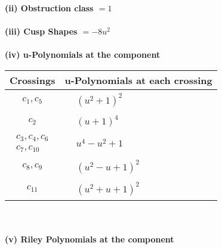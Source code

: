 \documentclass[1p]{elsarticle_modified}
\theoremstyle{definition}
\begin{document}
\flushleft \textbf{(ii) Obstruction class $= 1$}\\~\\
\flushleft \textbf{(iii) Cusp Shapes $= -8 u^2$}\\~\\
\newpage\renewcommand{\arraystretch}{1}
\flushleft \textbf{(iv) u-Polynomials at the component}\newline \\
\begin{tabular}{m{50pt}|m{274pt}}
Crossings & \hspace{64pt}u-Polynomials at each crossing \\
\hline $$\begin{aligned}c_{1},c_{5}\end{aligned}$$&$\begin{aligned}
&(u^2+1)^2
\end{aligned}$\\
\hline $$\begin{aligned}c_{2}\end{aligned}$$&$\begin{aligned}
&(u+1)^4
\end{aligned}$\\
\hline $$\begin{aligned}c_{3},c_{4},c_{6}\\c_{7},c_{10}\end{aligned}$$&$\begin{aligned}
&u^4- u^2+1
\end{aligned}$\\
\hline $$\begin{aligned}c_{8},c_{9}\end{aligned}$$&$\begin{aligned}
&(u^2- u+1)^2
\end{aligned}$\\
\hline $$\begin{aligned}c_{11}\end{aligned}$$&$\begin{aligned}
&(u^2+u+1)^2
\end{aligned}$\\
\hline
\end{tabular}\\~\\
\newpage\renewcommand{\arraystretch}{1}
\flushleft \textbf{(v) Riley Polynomials at the component}\newline \\
\end{document}
